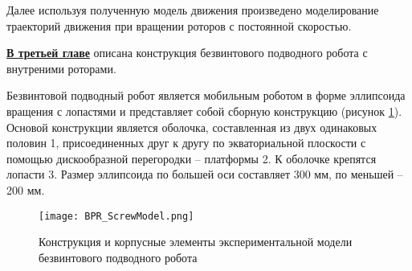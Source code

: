 %

Далее используя полученную модель движения произведено моделирование траекторий движения при вращении роторов с постоянной скоростью.





\underline{\textbf{В третьей главе}} описана конструкция безвинтового подводного робота с внутреними роторами. 

Безвинтовой подводный робот является мобильным роботом в форме эллипсоида вращения с лопастями и представляет собой сборную конструкцию (рисунок \ref{constr_BPR}). Основой конструкции является оболочка, составленная из двух одинаковых половин 1, присоединенных друг к другу по экваториальной плоскости с помощью дискообразной перегородки – платформы 2. К оболочке крепятся лопасти 3. Размер эллипсоида по большей оси составляет 300 мм, по меньшей – 200 мм. 

\begin{figure}[h]
	\centering
	\texttt{[image: BPR\_ScrewModel.png]}%
	\caption{Конструкция и корпусные элементы экспериментальной модели безвинтового подводного робота}
	\label{constr_BPR}
\end{figure}


